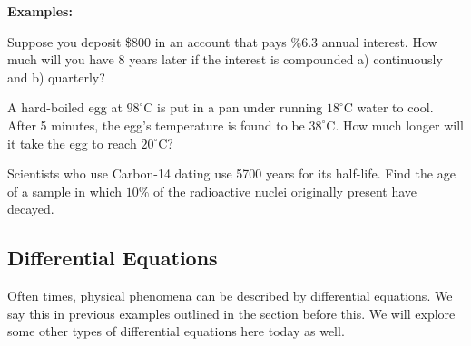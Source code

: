\documentclass[addpoints, 12pt]{exam}
\begin{document}
\vspace{1in}

\textbf{Examples:}
\begin{questions}
    \question Suppose you deposit \$800 in an account that pays \%6.3 annual interest. How much will you have 8 years later if the interest is compounded a) continuously and b) quarterly?
    
    \question A hard-boiled egg at $98^\circ$C is put in a pan under running $18^\circ$C water to cool. After 5 minutes, the egg's temperature is found to be $38^\circ$C. How much longer will it take the egg to reach $20^\circ$C?
    
    \question Scientists who use Carbon-14 dating use 5700 years for its half-life. Find the age of a sample in which $10\%$ of the radioactive nuclei originally present have decayed.
\end{questions}

\newpage
{}
\subsection*{Differential Equations}
Often times, physical phenomena can be described by differential equations. We say this in previous examples outlined in the section before this. We will explore some other types of differential equations here today as well.

\vspace{.25in}
\end{document}
